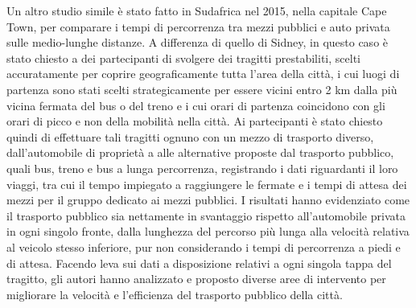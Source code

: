Un altro studio simile è stato fatto in Sudafrica nel 2015, nella capitale Cape Town, per comparare i tempi di percorrenza tra mezzi pubblici e auto privata sulle medio-lunghe distanze\cite{hitge2015}. A differenza di quello di Sidney, in questo caso è stato chiesto a dei partecipanti di svolgere dei tragitti prestabiliti, scelti accuratamente per coprire geograficamente tutta l'area della città, i cui luogi di partenza sono stati scelti strategicamente per essere vicini entro 2 km dalla più vicina fermata del bus o del treno e i cui orari di partenza coincidono con gli orari di picco e non della mobilità nella città. Ai partecipanti è stato chiesto quindi di effettuare tali tragitti ognuno con un mezzo di trasporto diverso, dall'automobile di proprietà a alle alternative proposte dal trasporto pubblico, quali bus, treno e bus a lunga percorrenza, registrando i dati riguardanti il loro viaggi, tra cui il tempo impiegato a raggiungere le fermate e i tempi di attesa dei mezzi per il gruppo dedicato ai mezzi pubblici. I risultati hanno evidenziato come il trasporto pubblico sia nettamente in svantaggio rispetto all'automobile privata in ogni singolo fronte, dalla lunghezza del percorso più lunga alla velocità relativa al veicolo stesso inferiore, pur non considerando i tempi di percorrenza a piedi e di attesa. Facendo leva sui dati a disposizione relativi a ogni singola tappa del tragitto, gli autori hanno analizzato e proposto diverse aree di intervento per migliorare la velocità e l'efficienza del trasporto pubblico della città.


























